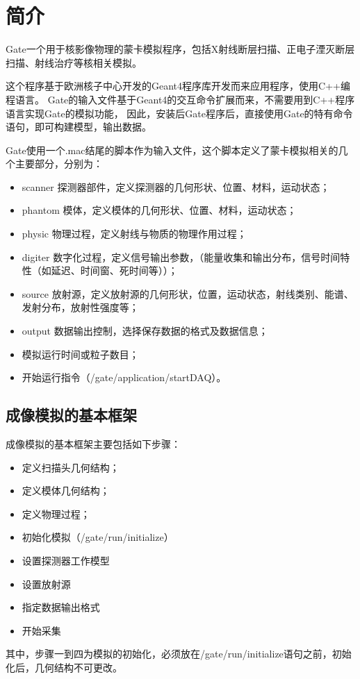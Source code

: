 
\chapter{简介}

Gate一个用于核影像物理的蒙卡模拟程序，包括X射线断层扫描、正电子湮灭断层扫描、射线治疗等核相关模拟。

这个程序基于欧洲核子中心开发的Geant4程序库开发而来应用程序，使用C++编程语言。
Gate的输入文件基于Geant4的交互命令扩展而来，不需要用到C++程序语言实现Gate的模拟功能，
因此，安装后Gate程序后，直接使用Gate的特有命令语句，即可构建模型，输出数据。

Gate使用一个.mac结尾的脚本作为输入文件，这个脚本定义了蒙卡模拟相关的几个主要部分，分别为：
\begin{itemize}
	\item scanner  探测器部件，定义探测器的几何形状、位置、材料，运动状态；
	\item phantom  模体，定义模体的几何形状、位置、材料，运动状态；
	\item physic  物理过程，定义射线与物质的物理作用过程；
	\item digiter  数字化过程，定义信号输出参数，（能量收集和输出分布，信号时间特性（如延迟、时间窗、死时间等））；
	\item source  放射源，定义放射源的几何形状，位置，运动状态，射线类别、能谱、发射分布，放射性强度等；
	\item output 数据输出控制，选择保存数据的格式及数据信息；
	\item 模拟运行时间或粒子数目；
	\item 开始运行指令（/gate/application/startDAQ）。
\end{itemize}

\section{成像模拟的基本框架}
成像模拟的基本框架主要包括如下步骤：
\begin{itemize}
	\item 定义扫描头几何结构；
	\item 定义模体几何结构；
	\item 定义物理过程；
	\item 初始化模拟（/gate/run/initialize）
	\item 设置探测器工作模型
	\item 设置放射源
	\item 指定数据输出格式
	\item 开始采集
\end{itemize}
其中，步骤一到四为模拟的初始化，必须放在/gate/run/initialize语句之前，初始化后，几何结构不可更改。

